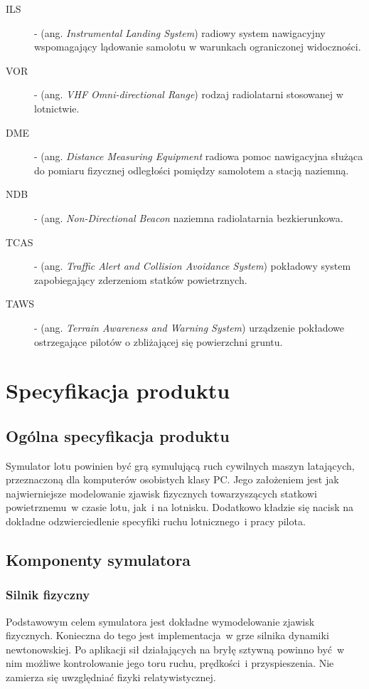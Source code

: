 \documentclass{mwrep}
\begin{document}
\begin{description}
\item[ILS] - (ang. \emph{Instrumental Landing System}) radiowy system nawigacyjny wspomagający lądowanie samolotu w warunkach ograniczonej widoczności.
\item[VOR] - (ang. \emph{VHF Omni-directional Range}) rodzaj radiolatarni stosowanej w lotnictwie.
\item[DME] - (ang. \emph{Distance Measuring Equipment} radiowa pomoc nawigacyjna służąca do pomiaru fizycznej odległości pomiędzy samolotem a stacją naziemną.
\item[NDB] - (ang. \emph{Non-Directional Beacon} naziemna radiolatarnia bezkierunkowa.
\item[TCAS] - (ang. \emph{Traffic Alert and Collision Avoidance System}) pokładowy system zapobiegający zderzeniom statków powietrznych.
\item[TAWS] - (ang. \emph{Terrain Awareness and Warning System}) urządzenie pokładowe ostrzegające pilotów o zbliżającej się powierzchni gruntu.
\end{description}

\chapter{Specyfikacja produktu}

\section{Ogólna specyfikacja produktu}

Symulator lotu powinien być grą symulującą ruch cywilnych maszyn latających, przeznaczoną dla komputerów osobistych klasy PC. Jego założeniem jest jak najwierniejsze modelowanie zjawisk fizycznych towarzyszących statkowi powietrznemu~w czasie lotu, jak~i na lotnisku. Dodatkowo kładzie się nacisk na dokładne odzwierciedlenie specyfiki ruchu lotnicznego~i pracy pilota.

\section{Komponenty symulatora}

\subsection{Silnik fizyczny}

Podstawowym celem symulatora jest dokładne wymodelowanie zjawisk fizycznych. Konieczna do tego jest implementacja~w grze silnika dynamiki newtonowskiej. Po aplikacji sił działających na bryłę sztywną powinno być~w nim możliwe kontrolowanie jego toru ruchu, prędkości~i przyspieszenia. Nie zamierza się uwzględniać fizyki relatywistycznej.
\end{document}
